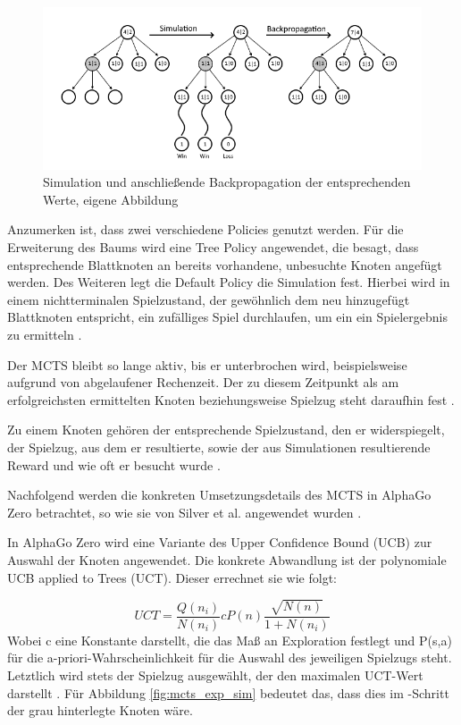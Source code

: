 \documentclass[12pt,a4paper]{article}
\begin{document}
\begin{figure}
\centering
\includegraphics[width=1.0\textwidth]{pics/Backpropagation.png}
\caption{Simulation und anschließende Backpropagation der entsprechenden Werte, eigene Abbildung}
	\label{fig:mcts_backpropagation}
\end{figure}

Anzumerken ist, dass zwei verschiedene Policies genutzt werden. Für die Erweiterung des Baums wird eine Tree Policy angewendet, die besagt, dass entsprechende Blattknoten an bereits vorhandene, unbesuchte Knoten angefügt werden. Des Weiteren legt die Default Policy die Simulation fest. Hierbei wird in einem nichtterminalen Spielzustand, der gewöhnlich dem neu hinzugefügt Blattknoten entspricht, ein zufälliges Spiel durchlaufen, um ein ein Spielergebnis zu ermitteln \cite{Browne2012}. 

Der MCTS bleibt so lange aktiv, bis er unterbrochen wird, beispielsweise aufgrund von abgelaufener Rechenzeit. Der zu diesem Zeitpunkt als am erfolgreichsten ermittelten Knoten beziehungsweise Spielzug steht daraufhin fest \cite{Browne2012}.

Zu einem Knoten gehören der entsprechende Spielzustand, den er widerspiegelt, der Spielzug, aus dem er resultierte, sowie der aus Simulationen resultierende Reward und wie oft er besucht wurde \cite{Browne2012}.

Nachfolgend werden die konkreten Umsetzungsdetails des MCTS in AlphaGo Zero betrachtet, so wie sie von Silver et al. angewendet wurden \cite{Silver2017}.

In AlphaGo Zero wird eine Variante des Upper Confidence Bound (UCB) zur Auswahl der Knoten angewendet. Die konkrete Abwandlung ist der polynomiale UCB applied to Trees (UCT). Dieser errechnet sie wie folgt:

\begin{equation}
UCT = \frac{Q(n_i)}{N(n_i)} cP(n) \frac{\sqrt{N(n)}}{1+N(n_i)}
\end{equation} 
Wobei c eine Konstante darstellt, die das Maß an Exploration festlegt und P(s,a) für die a-priori-Wahrscheinlichkeit für die Auswahl des jeweiligen Spielzugs steht. Letztlich wird stets der Spielzug ausgewählt, der den maximalen UCT-Wert darstellt \cite{Silver2017}.
Für Abbildung \ref{fig:mcts_exp_sim} bedeutet das, dass dies im \grqq{}-Schritt der grau hinterlegte Knoten wäre.
\end{document}
